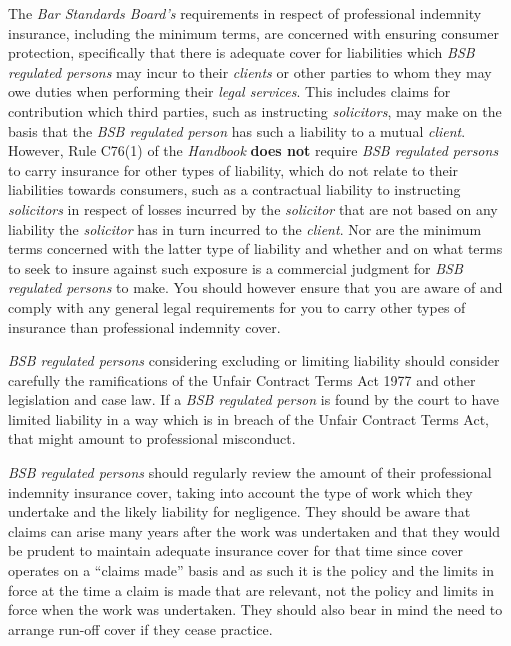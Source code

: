 The \emph{Bar Standards Board's} requirements in respect of professional
indemnity insurance, including the minimum terms, are concerned with
ensuring consumer protection, specifically that there is adequate cover
for liabilities which \emph{BSB regulated persons} may incur to their
\emph{clients} or other parties to whom they may owe duties when
performing their \emph{legal services}. This includes claims for
contribution which third parties, such as instructing \emph{solicitors},
may make on the basis that the \emph{BSB regulated person} has such a
liability to a mutual \emph{client}. However, Rule C76(1) of the
\emph{Handbook} \textcolor{myred}{\textbf{does not}} require \emph{BSB regulated persons} to carry
insurance for other types of liability, which do not relate to their
liabilities towards consumers, such as a contractual liability to
instructing \emph{solicitors} in respect of losses incurred by the
\emph{solicitor} that are not based on any liability the
\emph{solicitor} has in turn incurred to the \emph{client}. Nor are the
minimum terms concerned with the latter type of liability and whether
and on what terms to seek to insure against such exposure is a
commercial judgment for \emph{BSB regulated persons} to make. You should
however ensure that you are aware of and comply with any general legal
requirements for you to carry other types of insurance than professional
indemnity cover.

\emph{BSB regulated persons} considering excluding or limiting liability
should consider carefully the ramifications of the Unfair Contract Terms
Act 1977 and other legislation and case law. If a \emph{BSB regulated
person} is found by the court to have limited liability in a way which
is in breach of the Unfair Contract Terms Act, that might amount to
professional misconduct.

\emph{BSB regulated persons} should regularly review the amount of their
professional indemnity insurance cover, taking into account the type of
work which they undertake and the likely liability for negligence. They
should be aware that claims can arise many years after the work was
undertaken and that they would be prudent to maintain adequate insurance
cover for that time since cover operates on a ``claims made'' basis and
as such it is the policy and the limits in force at the time a claim is
made that are relevant, not the policy and limits in force when the work
was undertaken. They should also bear in mind the need to arrange
run-off cover if they cease practice.

